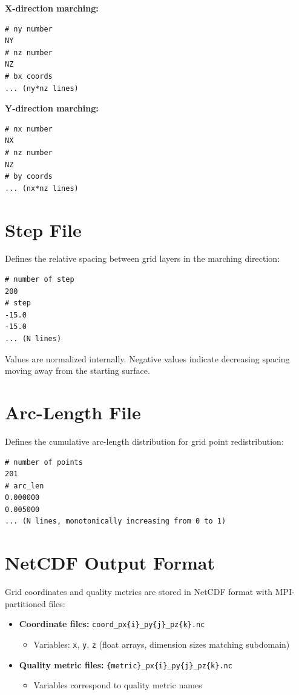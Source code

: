 \documentclass[11pt,a4paper]{report}
\begin{document}
\textbf{X-direction marching:}
\begin{lstlisting}[language={}]
# ny number
NY
# nz number
NZ
# bx coords
... (ny*nz lines)
\end{lstlisting}

\textbf{Y-direction marching:}
\begin{lstlisting}[language={}]
# nx number
NX
# nz number
NZ
# by coords
... (nx*nz lines)
\end{lstlisting}

\section{Step File}

Defines the relative spacing between grid layers in the marching direction:

\begin{lstlisting}[language={}]
# number of step
200
# step
-15.0
-15.0
... (N lines)
\end{lstlisting}

Values are normalized internally. Negative values indicate decreasing spacing moving away from the starting surface.

\section{Arc-Length File}

Defines the cumulative arc-length distribution for grid point redistribution:

\begin{lstlisting}[language={}]
# number of points
201
# arc_len
0.000000
0.005000
... (N lines, monotonically increasing from 0 to 1)
\end{lstlisting}

\section{NetCDF Output Format}

Grid coordinates and quality metrics are stored in NetCDF format with MPI-partitioned files:

\begin{itemize}
    \item \textbf{Coordinate files:} \texttt{coord\_px\{i\}\_py\{j\}\_pz\{k\}.nc}
    \begin{itemize}
        \item Variables: \texttt{x}, \texttt{y}, \texttt{z} (float arrays, dimension sizes matching subdomain)
    \end{itemize}
    \item \textbf{Quality metric files:} \texttt{\{metric\}\_px\{i\}\_py\{j\}\_pz\{k\}.nc}
    \begin{itemize}
        \item Variables correspond to quality metric names
    \end{itemize}
\end{itemize}
\end{document}
